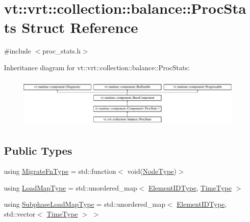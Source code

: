 \hypertarget{structvt_1_1vrt_1_1collection_1_1balance_1_1_proc_stats}{}\section{vt\+:\+:vrt\+:\+:collection\+:\+:balance\+:\+:Proc\+Stats Struct Reference}
\label{structvt_1_1vrt_1_1collection_1_1balance_1_1_proc_stats}


{\ttfamily \#include $<$proc\+\_\+stats.\+h$>$}

Inheritance diagram for vt\+:\+:vrt\+:\+:collection\+:\+:balance\+:\+:Proc\+Stats\+:\begin{figure}[H]
\begin{center}
\leavevmode
\includegraphics[height=2.565865cm]{structvt_1_1vrt_1_1collection_1_1balance_1_1_proc_stats}
\end{center}
\end{figure}
\subsection*{Public Types}
\begin{DoxyCompactItemize}
\item 
using \hyperlink{structvt_1_1vrt_1_1collection_1_1balance_1_1_proc_stats_a7cb065ac4de218cb717bc2634782f0cb}{Migrate\+Fn\+Type} = std\+::function$<$ void(\hyperlink{namespacevt_a866da9d0efc19c0a1ce79e9e492f47e2}{Node\+Type})$>$
\item 
using \hyperlink{structvt_1_1vrt_1_1collection_1_1balance_1_1_proc_stats_aa810fd21680061ec5d50f6526f66be31}{Load\+Map\+Type} = std\+::unordered\+\_\+map$<$ \hyperlink{namespacevt_1_1vrt_1_1collection_1_1balance_a14c8d2c972f2913aa3f1636e5be0a120}{Element\+I\+D\+Type}, \hyperlink{namespacevt_a876a9d0cd5a952859c72de8a46881442}{Time\+Type} $>$
\item 
using \hyperlink{structvt_1_1vrt_1_1collection_1_1balance_1_1_proc_stats_ab2312e47e475143cf295d45cb2493f48}{Subphase\+Load\+Map\+Type} = std\+::unordered\+\_\+map$<$ \hyperlink{namespacevt_1_1vrt_1_1collection_1_1balance_a14c8d2c972f2913aa3f1636e5be0a120}{Element\+I\+D\+Type}, std\+::vector$<$ \hyperlink{namespacevt_a876a9d0cd5a952859c72de8a46881442}{Time\+Type} $>$ $>$
\end{DoxyCompactItemize}
